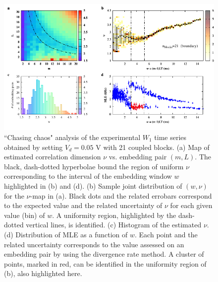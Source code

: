 \begin{figure}[H]
    \centering
    \includegraphics[width=\linewidth]{../blocks/21_blocks/edge/2e5_points/plots/chaos_low.pdf}
    \caption{``Chasing chaos" analysis of the experimental $W_1$ time series obtained by setting $V_d=0.05$ V with 21 coupled blocks.
    (a) Map of estimated correlation dimension $\nu$ vs. embedding pair $(m, L)$.
    The black, dash-dotted hyperbolae bound the region of uniform $\nu$ corresponding to the interval of the
    embedding window $w$ highlighted in (b) and (d).
    (b) Sample joint distribution of $(w,\nu)$ for the $\nu$-map in (a).
    Black dots and the related errobars correspond to the expected value and the related uncertainty of $\nu$
    for each given value (bin) of $w$. A uniformity region, highlighted by the dash-dotted vertical lines,
    is identified. (c) Histogram of the estimated $\nu$. (d) Distribution of MLE as a function of $w$. Each point and the related
    uncertainty corresponds to the value assessed on an embedding pair by using the divergence rate method.
    A cluster of points, marked in red, can be identified in the uniformity region of (b), also highlighted here.}
    \label{fig:21 blocks chaos}
\end{figure}

